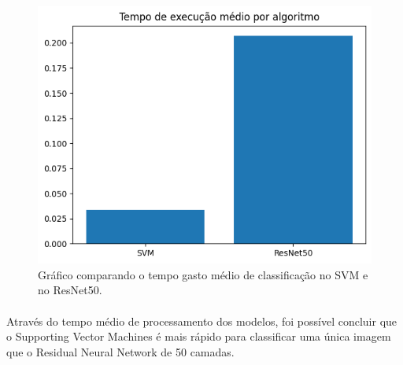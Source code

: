 \documentclass[12pt]{article}
\begin{document}
\begin{figure}
    \centering
    \includegraphics{ResNet50 vs SVM media.png}
    \caption{Gráfico comparando o tempo gasto médio de classificação no SVM e no ResNet50.}
    \label{fig:grafico-svm-vs-resnet-tempo}
\end{figure}

\paragraph{}Através do tempo médio de processamento dos modelos, foi possível concluir que o Supporting Vector Machines é mais rápido para classificar uma única imagem que o Residual Neural Network de 50 camadas.
\end{document}
